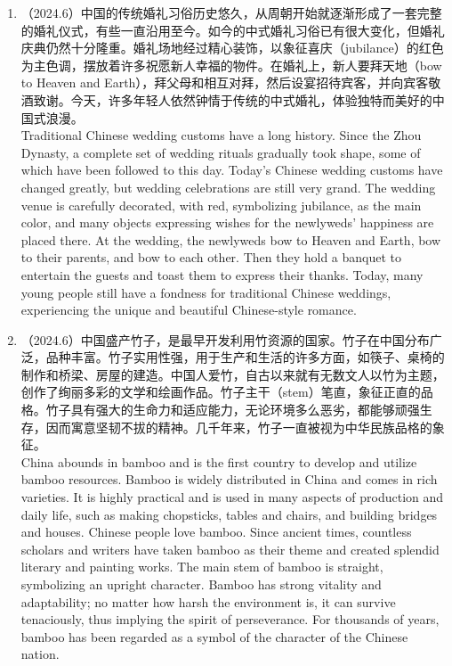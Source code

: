 ﻿\documentclass[lang=cn,11pt]{elegantbook}
\begin{document}
\begin{enumerate}
    \item （2024.6）中国的传统婚礼习俗历史悠久，从周朝开始就逐渐形成了一套完整的婚礼仪式，有些一直沿用至今。如今的中式婚礼习俗已有很大变化，但婚礼庆典仍然十分隆重。婚礼场地经过精心装饰，以象征喜庆（jubilance）的红色为主色调，摆放着许多祝愿新人幸福的物件。在婚礼上，新人要拜天地（bow to Heaven and Earth），拜父母和相互对拜，然后设宴招待宾客，并向宾客敬酒致谢。今天，许多年轻人依然钟情于传统的中式婚礼，体验独特而美好的中国式浪漫。\\Traditional Chinese wedding customs have a long history. Since the Zhou Dynasty, a complete set of wedding rituals gradually took shape, some of which have been followed to this day. Today’s Chinese wedding customs have changed greatly, but wedding celebrations are still very grand. The wedding venue is carefully decorated, with red, symbolizing jubilance, as the main color, and many objects expressing wishes for the newlyweds’ happiness are placed there. At the wedding, the newlyweds bow to Heaven and Earth, bow to their parents, and bow to each other. Then they hold a banquet to entertain the guests and toast them to express their thanks. Today, many young people still have a fondness for traditional Chinese weddings, experiencing the unique and beautiful Chinese-style romance.
    \item （2024.6）中国盛产竹子，是最早开发利用竹资源的国家。竹子在中国分布广泛，品种丰富。竹子实用性强，用于生产和生活的许多方面，如筷子、桌椅的制作和桥梁、房屋的建造。中国人爱竹，自古以来就有无数文人以竹为主题，创作了绚丽多彩的文学和绘画作品。竹子主干（stem）笔直，象征正直的品格。竹子具有强大的生命力和适应能力，无论环境多么恶劣，都能够顽强生存，因而寓意坚韧不拔的精神。几千年来，竹子一直被视为中华民族品格的象征。\\China abounds in bamboo and is the first country to develop and utilize bamboo resources. Bamboo is widely distributed in China and comes in rich varieties. It is highly practical and is used in many aspects of production and daily life, such as making chopsticks, tables and chairs, and building bridges and houses. Chinese people love bamboo. Since ancient times, countless scholars and writers have taken bamboo as their theme and created splendid literary and painting works. The main stem of bamboo is straight, symbolizing an upright character. Bamboo has strong vitality and adaptability; no matter how harsh the environment is, it can survive tenaciously, thus implying the spirit of perseverance. For thousands of years, bamboo has been regarded as a symbol of the character of the Chinese nation.

\end{enumerate}
\end{document}
